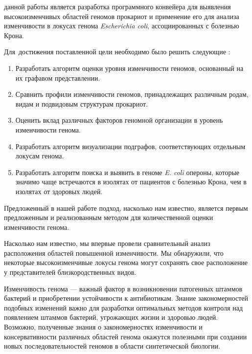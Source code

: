 {\aim} данной работы является разработка программного конвейера для выявления высокоизменчивых областей геномов прокариот и применение его для анализа изменчивости в локусах генома \textit{Escherichia coli}, ассоциированных с болезнью Крона.


Для~достижения поставленной цели необходимо было решить следующие {\tasks}:
\begin{enumerate}[beginpenalty=10000] 
  \item Разработать алгоритм оценки уровня изменчивости геномов, основанный на их графавом представлении.
  \item Сравнить профили изменчивости геномов, принадлежащих различным родам, видам и подвидовым структурам прокариот.
  \item Оценить вклад различных факторов геномной организации в уровень изменчивости генома. 
  \item Разработать алгоритм визуализации подграфов, соответствующих отдельным локусам генома.
  \item Разработать алгоритм поиска и выявить в геноме \textit{E. coli} опероны, которые значимо чаще встречаются в изолятах от пациентов с болезнью Крона, чем в изолятах от здоровых людей.  
\end{enumerate}


{\novelty}
Предложенный в нашей работе подход, насколько нам известно, является первым предложенным и реализованным методом для количественной оценки изменчивости генома. 

Насколько нам известно, мы впервые провели сравнительный анализ расположения областей повышенной изменчивости. Мы обнаружили, что некоторые высокоизменчивые локусы генома могут сохранять свое расположение у представителей близкородственных видов. 

{\influence} 

Изменчивость генома --- важный фактор в возникновении патогенных штаммов бактерий и приобретении устойчивости к антибиотикам. Знание закономерностей подобных изменений важно для разработки оптимальных методов контроля над появлением штаммов бактерий, угрожающих жизни и здоровью людей. Возможно, полученные знания о закономерностях изменчивости и консервативности различных областей генома окажутся полезными при создании новых последовательностей геномов в области синтетической биологии. 

